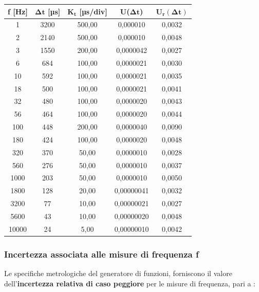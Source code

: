 \begin{table}[!ht]
    \centering
    \begin{tabular}{|c|c|c|c|c|}
    \hline

        \textbf{f [Hz]} & \textbf{$\bm{\Delta t}$ [µs]} & \textbf{$\bm{K_t}$ [µs/div]} & \textbf{U($\bm{\Delta t}$)} & \textbf{$\bm{U_r(\Delta t)}$} \\ \hline

        1 & 3200 & 500,00 & 0,000010 & 0,0032 \\ \hline
        2 & 2140 & 500,00 & 0,000010 & 0,0048 \\ \hline
        3 & 1550 & 200,00 & 0,0000042 & 0,0027 \\ \hline
        6 & 684 & 100,00 & 0,0000021 & 0,0030 \\ \hline
        10 & 592 & 100,00 & 0,0000021 & 0,0035 \\ \hline
        18 & 500 & 100,00 & 0,0000021 & 0,0041 \\ \hline
        32 & 480 & 100,00 & 0,0000020 & 0,0043 \\ \hline
        56 & 464 & 100,00 & 0,0000020 & 0,0044 \\ \hline
        100 & 448 & 200,00 & 0,0000040 & 0,0090 \\ \hline
        180 & 424 & 100,00 & 0,0000020 & 0,0048 \\ \hline
        320 & 370 & 50,00 & 0,0000010 & 0,0028 \\ \hline
        560 & 276 & 50,00 & 0,0000010 & 0,0037 \\ \hline
        1000 & 203 & 50,00 & 0,0000010 & 0,0050 \\ \hline
        1800 & 128 & 20,00 & 0,00000041 & 0,0032 \\ \hline
        3200 & 77 & 10,00 & 0,00000021 & 0,0027 \\ \hline
        5600 & 43 & 10,00 & 0,00000020 & 0,0048 \\ \hline
        10000 & 24 & 5,00 & 0,00000010 & 0,0042 \\ \hline
    \end{tabular}
\end{table}
\FloatBarrier
\clearpage


\subsubsection*{Incertezza associata alle misure di frequenza f}

Le specifiche metrologiche del generatore di funzioni, forniscono il valore dell'\textbf{incertezza relativa di caso peggiore} per le misure di frequenza, pari a :

